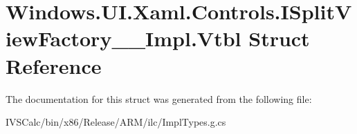 \hypertarget{struct_windows_1_1_u_i_1_1_xaml_1_1_controls_1_1_i_split_view_factory_____impl_1_1_vtbl}{}\section{Windows.\+U\+I.\+Xaml.\+Controls.\+I\+Split\+View\+Factory\+\_\+\+\_\+\+Impl.\+Vtbl Struct Reference}
\label{struct_windows_1_1_u_i_1_1_xaml_1_1_controls_1_1_i_split_view_factory_____impl_1_1_vtbl}


The documentation for this struct was generated from the following file\+:\begin{DoxyCompactItemize}
\item 
I\+V\+S\+Calc/bin/x86/\+Release/\+A\+R\+M/ilc/Impl\+Types.\+g.\+cs\end{DoxyCompactItemize}
